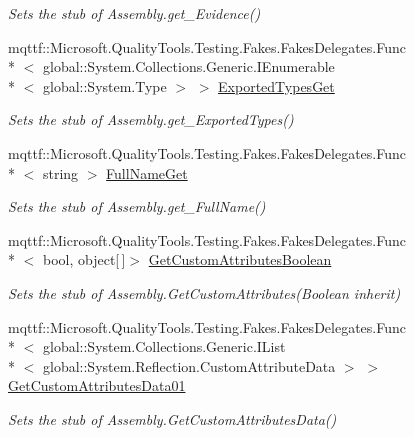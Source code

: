 \begin{DoxyCompactItemize}
\begin{DoxyCompactList}\small\item\em Sets the stub of Assembly.\-get\-\_\-\-Evidence()\end{DoxyCompactList}\item 
mqttf\-::\-Microsoft.\-Quality\-Tools.\-Testing.\-Fakes.\-Fakes\-Delegates.\-Func\\*
$<$ global\-::\-System.\-Collections.\-Generic.\-I\-Enumerable\\*
$<$ global\-::\-System.\-Type $>$ $>$ \hyperlink{class_system_1_1_reflection_1_1_fakes_1_1_stub_assembly_af57cfff941a84036253c073b9d6f089e}{Exported\-Types\-Get}
\begin{DoxyCompactList}\small\item\em Sets the stub of Assembly.\-get\-\_\-\-Exported\-Types()\end{DoxyCompactList}\item 
mqttf\-::\-Microsoft.\-Quality\-Tools.\-Testing.\-Fakes.\-Fakes\-Delegates.\-Func\\*
$<$ string $>$ \hyperlink{class_system_1_1_reflection_1_1_fakes_1_1_stub_assembly_a979eef9dc939e45874ebc98f363106bd}{Full\-Name\-Get}
\begin{DoxyCompactList}\small\item\em Sets the stub of Assembly.\-get\-\_\-\-Full\-Name()\end{DoxyCompactList}\item 
mqttf\-::\-Microsoft.\-Quality\-Tools.\-Testing.\-Fakes.\-Fakes\-Delegates.\-Func\\*
$<$ bool, object\mbox{[}$\,$\mbox{]}$>$ \hyperlink{class_system_1_1_reflection_1_1_fakes_1_1_stub_assembly_a5d6230862985b66db12f86f2b48134f9}{Get\-Custom\-Attributes\-Boolean}
\begin{DoxyCompactList}\small\item\em Sets the stub of Assembly.\-Get\-Custom\-Attributes(\-Boolean inherit)\end{DoxyCompactList}\item 
mqttf\-::\-Microsoft.\-Quality\-Tools.\-Testing.\-Fakes.\-Fakes\-Delegates.\-Func\\*
$<$ global\-::\-System.\-Collections.\-Generic.\-I\-List\\*
$<$ global\-::\-System.\-Reflection.\-Custom\-Attribute\-Data $>$ $>$ \hyperlink{class_system_1_1_reflection_1_1_fakes_1_1_stub_assembly_aba40b108fd129dff2baff9f81d965508}{Get\-Custom\-Attributes\-Data01}
\begin{DoxyCompactList}\small\item\em Sets the stub of Assembly.\-Get\-Custom\-Attributes\-Data()\end{DoxyCompactList}\item 

\end{DoxyCompactItemize}

